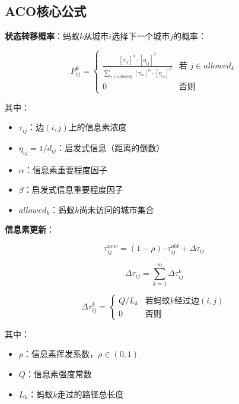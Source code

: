 \begin{center}
\end{center}

\subsection{ACO核心公式}

\textbf{状态转移概率}：蚂蚁$k$从城市$i$选择下一个城市$j$的概率：

\begin{formulabox}
$$P_{ij}^k = \begin{cases}
\frac{[\tau_{ij}]^\alpha \cdot [\eta_{ij}]^\beta}{\sum_{s \in allowed_k} [\tau_{is}]^\alpha \cdot [\eta_{is}]^\beta} & \text{若 } j \in allowed_k \\
0 & \text{否则}
\end{cases}$$

其中：
\begin{itemize}[itemsep=0pt]
    \item $\tau_{ij}$：边$(i,j)$上的信息素浓度
    \item $\eta_{ij} = 1/d_{ij}$：启发式信息（距离的倒数）
    \item $\alpha$：信息素重要程度因子
    \item $\beta$：启发式信息重要程度因子
    \item $allowed_k$：蚂蚁$k$尚未访问的城市集合
\end{itemize}
\end{formulabox}

\textbf{信息素更新}：

\begin{formulabox}
$$\tau_{ij}^{new} = (1-\rho) \cdot \tau_{ij}^{old} + \Delta\tau_{ij}$$

$$\Delta\tau_{ij} = \sum_{k=1}^{m} \Delta\tau_{ij}^k$$

$$\Delta\tau_{ij}^k = \begin{cases}
Q / L_k & \text{若蚂蚁}k\text{经过边}(i,j) \\
0 & \text{否则}
\end{cases}$$

其中：
\begin{itemize}[itemsep=0pt]
    \item $\rho$：信息素挥发系数，$\rho \in (0,1)$
    \item $Q$：信息素强度常数
    \item $L_k$：蚂蚁$k$走过的路径总长度
\end{itemize}
\end{formulabox}

